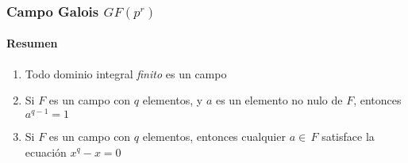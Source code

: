 \documentclass{beamer}
\begin{document}
\begin{frame}
	\frametitle{Campo Galois $GF(p^r)$}
	\framesubtitle{Resumen}
	\begin{enumerate}
		\item Todo dominio integral {\em finito} es un campo\\
		\item Si $F$ es un campo con $q$ elementos, y $a$ es un elemento no nulo de $F$, entonces $a^{q-1}=1$\\
		\item Si $F$ es un campo con $q$ elementos, entonces cualquier $a \in \, F$ satisface la ecuaci\'on $x^q-x=0$\\
	\end{enumerate}
\end{frame}
\end{document}
